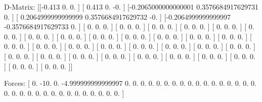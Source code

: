D-Matrix:
[[-0.413               0.                  0.                ]
 [ 0.413               0.                 -0.                ]
 [-0.2065000000000001  0.3576684917629731  0.                ]
 [ 0.2064999999999999  0.3576684917629732 -0.                ]
 [-0.2064999999999997 -0.3576684917629733  0.                ]
 [ 0.                  0.                  0.                ]
 [ 0.                  0.                  0.                ]
 [ 0.                  0.                  0.                ]
 [ 0.                  0.                  0.                ]
 [ 0.                  0.                  0.                ]
 [ 0.                  0.                  0.                ]
 [ 0.                  0.                  0.                ]
 [ 0.                  0.                  0.                ]
 [ 0.                  0.                  0.                ]
 [ 0.                  0.                  0.                ]
 [ 0.                  0.                  0.                ]
 [ 0.                  0.                  0.                ]
 [ 0.                  0.                  0.                ]
 [ 0.                  0.                  0.                ]
 [ 0.                  0.                  0.                ]
 [ 0.                  0.                  0.                ]
 [ 0.                  0.                  0.                ]
 [ 0.                  0.                  0.                ]
 [ 0.                  0.                  0.                ]
 [ 0.                  0.                  0.                ]
 [ 0.                  0.                  0.                ]
 [ 0.                  0.                  0.                ]
 [ 0.                  0.                  0.                ]
 [ 0.                  0.                  0.                ]
 [ 0.                  0.                  0.                ]
 [ 0.                  0.                  0.                ]
 [ 0.                  0.                  0.                ]
 [ 0.                  0.                  0.                ]
 [ 0.                  0.                  0.                ]
 [ 0.                  0.                  0.                ]
 [ 0.                  0.                  0.                ]]

Forces:
[  0.                -10.                  0.
  -4.999999999999997   0.                  0.
   0.                  0.                  0.
   0.                  0.                  0.
   0.                  0.                  0.
   0.                  0.                  0.
   0.                  0.                  0.
   0.                  0.                  0.
   0.                  0.                  0.
   0.                  0.                  0.
   0.                  0.                  0.
   0.                  0.                  0.               ]

